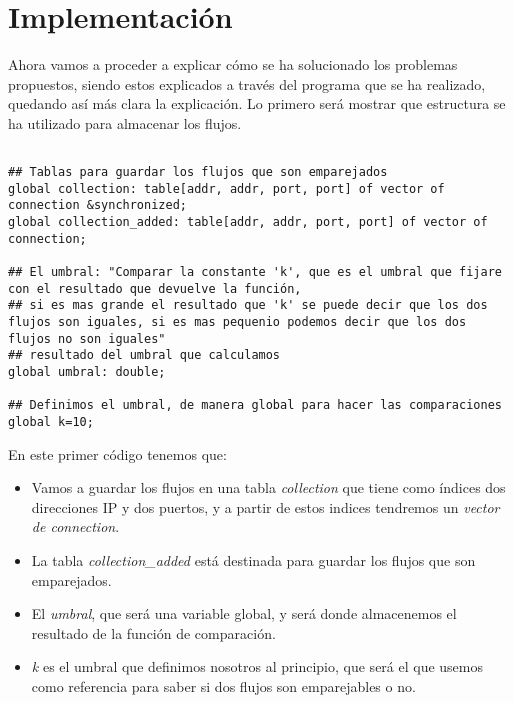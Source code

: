 \chapter{Implementación}

Ahora vamos a proceder a explicar cómo se ha solucionado los problemas 
propuestos, siendo estos explicados a través del programa que se ha 
realizado, quedando así más clara la explicación.
\intro
\noindent Lo primero será mostrar que estructura se ha utilizado para almacenar los 
flujos.
\intro
\begin{lstlisting}[style=CodigoC]

## Tablas para guardar los flujos que son emparejados
global collection: table[addr, addr, port, port] of vector of connection &synchronized;
global collection_added: table[addr, addr, port, port] of vector of connection;

## El umbral: "Comparar la constante 'k', que es el umbral que fijare con el resultado que devuelve la función,
## si es mas grande el resultado que 'k' se puede decir que los dos flujos son iguales, si es mas pequenio podemos decir que los dos flujos no son iguales"
## resultado del umbral que calculamos
global umbral: double;

## Definimos el umbral, de manera global para hacer las comparaciones
global k=10;

\end{lstlisting}

\noindent En este primer código tenemos que: 
\begin{itemize}
\item Vamos a guardar los flujos en una tabla \textit{collection} que tiene como índices 
dos direcciones IP y dos puertos, y a partir de estos indices tendremos un \textit{vector de connection}.
\item La tabla \textit{collection\_added} está destinada para guardar los flujos que son 
emparejados.
\item El \textit{umbral}, que será una variable global, y será donde almacenemos el resultado 
de la función de comparación.
\item \textit{k} es el umbral que definimos nosotros al principio, que será el que usemos como 
referencia para saber si dos flujos son emparejables o no.
\end{itemize}

